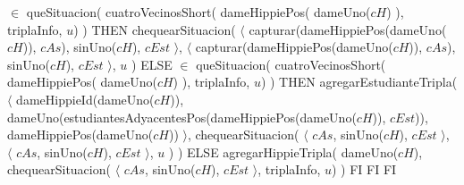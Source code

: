 \documentclass[8pt, a4paper]{article}
\begin{document}
\begin{tad}{}
{			{ $\in$ queSituacion( cuatroVecinosShort( dameHippiePos( dameUno($cH$) ), triplaInfo, $u$) ) 
				THEN 
					chequearSituacion( 
						$\langle$ 
							capturar(dameHippiePos(dameUno($cH$)), $cAs$), 
							sinUno($cH$), 
							$cEst$ 
						$\rangle$, 
						$\langle$ 
							capturar(dameHippiePos(dameUno($cH$)), $cAs$), 
							sinUno($cH$), 
							$cEst$ 
						$\rangle$, 
						$u$
					)
				ELSE
					{ $\in$ queSituacion( cuatroVecinosShort( dameHippiePos( dameUno($cH$) ), triplaInfo, $u$) ) 
						THEN
							agregarEstudianteTripla(
								$\langle$ 
									dameHippieId(dameUno($cH$)), 
									dameUno(estudiantesAdyacentesPos(dameHippiePos(dameUno($cH$)), $cEst$)), 
									dameHippiePos(dameUno($cH$)) 
								$\rangle$, 
								chequearSituacion( 
									$\langle$ 
										$cAs$, 
										sinUno($cH$), 
										$cEst$  
									$\rangle$, 
									$\langle$ 
										$cAs$, 
										sinUno($cH$), 
										$cEst$ 
									$\rangle$, 
									$u$
								)
							)
						ELSE
							agregarHippieTripla( 
								dameUno($cH$), 
								chequearSituacion( 
									$\langle$ 
										$cAs$, 
										sinUno($cH$), 
										$cEst$  
									$\rangle$, 
								triplaInfo, 
								$u$) 
							)
					FI}
			FI}
	FI
}



\end{tad}
\end{document}
